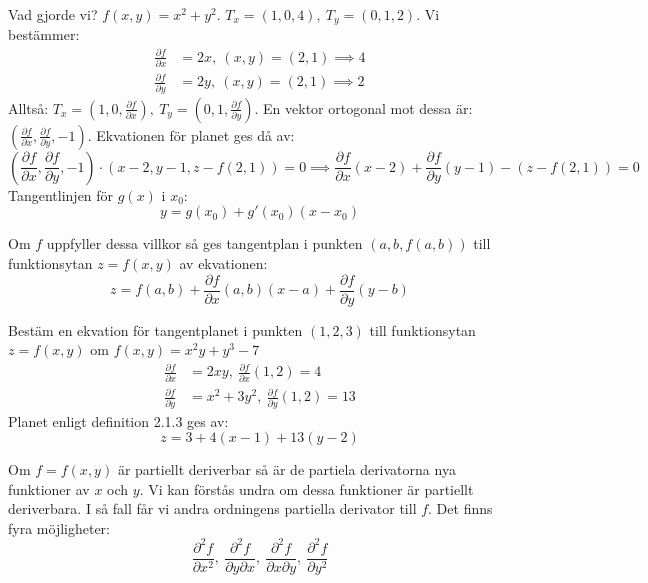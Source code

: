 \documentclass{report}
\begin{document}
Vad gjorde vi? $ f(x,y) = x^2+y^2 $. $ T_x = (1,0,4),\: T_y = (0,1,2) $. Vi bestämmer:
\begin{align*}
	\frac{\partial f}{\partial x} &= 2x, \: (x,y) = (2,1) \implies 4\\
	\frac{\partial f}{\partial y} &= 2y, \: (x,y) = (2,1) \implies 2
\end{align*}
Alltså: $ T_x = (1,0, \frac{\partial f}{\partial x} ), \: T_y = (0,1, \frac{\partial f}{\partial y} )$. En vektor ortogonal mot dessa är: $ ( \frac{\partial f}{\partial x} , \frac{\partial f}{\partial y}, -1) $. Ekvationen för planet ges då av:
\begin{equation*}
	( \frac{\partial f}{\partial x}, \frac{\partial f}{\partial y}, -1 ) \cdot ( x-2,y-1, z-f(2,1) ) = 0 \implies \frac{\partial f}{\partial x} (x-2) + \frac{\partial f}{\partial y} (y-1) - (z - f(2,1)) = 0
\end{equation*}
Tangentlinjen för $ g(x) $ i $ x_0 $:
\begin{equation*}
y = g(x_0) + g'(x_0)( x-x_0 )
\end{equation*}

{
Om $ f $ uppfyller dessa villkor så ges tangentplan i punkten $ (a,b, f(a,b)) $ till funktionsytan $ z = f(x,y) $ av ekvationen:
\begin{equation*}
z = f(a,b)+ \frac{\partial f}{\partial x}(a,b)(x-a) + \frac{\partial f}{\partial y}(y-b)
\end{equation*}
}

\vspace{20pt}
\qs{}
{
Bestäm en ekvation för tangentplanet i punkten $ (1,2,3) $ till funktionsytan $ z = f(x,y) $ om $ f(x,y) = x^2y+y^3-7 $ 
}
\sol 
\begin{align*}
	\frac{\partial f}{\partial x} &= 2xy, \: \frac{\partial f}{\partial x}(1,2) = 4\\
	\frac{\partial f}{\partial y} &= x^2+3y^2, \: \frac{\partial f}{\partial y}(1,2) = 13
\end{align*}
Planet enligt definition 2.1.3 ges av:
\begin{equation*}
z = 3 + 4(x-1) + 13(y-2)
\end{equation*}

\vspace{20pt}
\noindent
Om $ f = f(x,y) $ är partiellt deriverbar så är de partiela derivatorna nya funktioner av $ x $ och $ y $. Vi kan förstås undra om dessa funktioner är partiellt deriverbara. I så fall får vi andra ordningens partiella derivator till $ f $. Det finns fyra möjligheter:
\begin{equation*}
\frac{\partial^2 f}{\partial x^2}, \: \frac{\partial^2 f}{\partial y \partial x}, \: \frac{\partial^2 f}{\partial x \partial y}, \: \frac{\partial^2 f}{\partial y^2}
\end{equation*}
\end{document}
